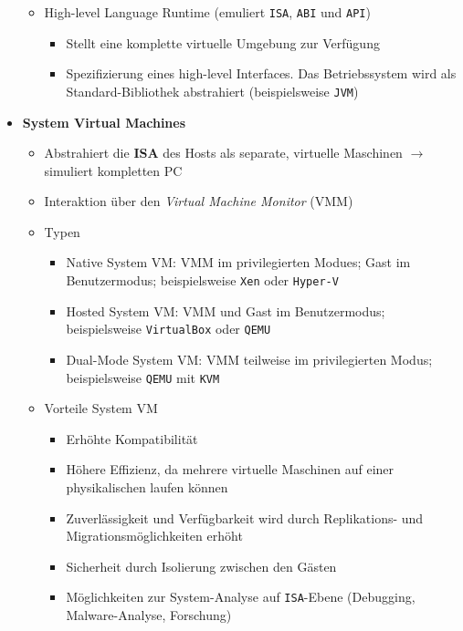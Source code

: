 \begin{itemize}
\begin{itemize}
\begin{itemize}
		\end{itemize}
		\item High-level Language Runtime (emuliert \texttt{ISA}, \texttt{ABI} und \texttt{API})
		\begin{itemize}
			\item Stellt eine komplette virtuelle Umgebung zur Verfügung
			\item Spezifizierung eines high-level Interfaces. Das Betriebssystem wird als Standard-Bibliothek abstrahiert (beispielsweise \texttt{JVM})
		\end{itemize}
	\end{itemize}
	\item \textbf{System Virtual Machines}
	\begin{itemize}
		\item Abstrahiert die \textbf{ISA} des Hosts als separate, virtuelle Maschinen \(\rightarrow\) simuliert kompletten PC
		\item Interaktion über den \textit{Virtual Machine Monitor} (VMM)
		\item Typen
		\begin{itemize}
			\item Native System VM: VMM im privilegierten Modues; Gast im Benutzermodus; beispielsweise \texttt{Xen} oder \texttt{Hyper-V}
			\item Hosted System VM: VMM und Gast im Benutzermodus; beispielsweise \texttt{VirtualBox} oder \texttt{QEMU}
			\item Dual-Mode System VM: VMM teilweise im privilegierten Modus; beispielsweise \texttt{QEMU} mit \texttt{KVM}
		\end{itemize}
		\item Vorteile System VM
		\begin{itemize}
			\item Erhöhte Kompatibilität
			\item Höhere Effizienz, da mehrere virtuelle Maschinen auf einer physikalischen laufen können
			\item Zuverlässigkeit und Verfügbarkeit wird durch Replikations- und Migrationsmöglichkeiten erhöht
			\item Sicherheit durch Isolierung zwischen den Gästen
			\item Möglichkeiten zur System-Analyse auf \texttt{ISA}-Ebene (Debugging, Malware-Analyse, Forschung)
		\end{itemize}
	\end{itemize}
\end{itemize}




